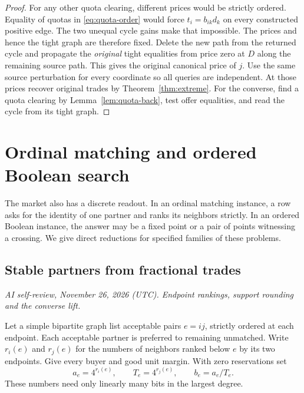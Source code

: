 \documentclass[11pt,oneside,openany,notitlepage]{report}
\newcommand{\reviewdate}{November 26, 2026 (UTC)}
\newcommand{\reviewmark}[1]{\par\nopagebreak[4]\noindent
  {\footnotesize\itshape AI self-review, \reviewdate. #1\par}\nobreak\smallskip}
\begin{document}
\begin{proof}
For any other quota clearing, different prices would be strictly ordered.
Equality of quotas in \eqref{eq:quota-order} would force
\(t_i=b_{ik}d_k\) on every constructed positive edge. The two unequal
cycle gains make that impossible. The prices and hence the tight graph
are therefore fixed. Delete the new path from the returned cycle and
propagate the \emph{original} tight equalities from price zero at \(D\)
along the remaining source path. This gives the original canonical price
of \(j\). Use the same source perturbation for every coordinate so all
queries are independent. At those prices recover original trades by
Theorem~\ref{thm:extreme}. For the converse, find a quota clearing by
Lemma~\ref{lem:quota-back}, test offer equalities, and read the cycle
from its tight graph.
\end{proof}

\chapter{Ordinal matching and ordered Boolean search}\label{sec:boolean}

The market also has a discrete readout. In an ordinal matching instance,
a row asks for the identity of one partner and ranks its neighbors
strictly. In an ordered Boolean instance, the answer may be a fixed
point or a pair of points witnessing a crossing. We give direct
reductions for specified families of these problems.

\section{Stable partners from fractional trades}
\reviewmark{Endpoint rankings, support rounding and the converse lift.}

Let a simple bipartite graph list acceptable pairs \(e=ij\), strictly
ordered at each endpoint. Each acceptable partner is preferred to
remaining unmatched. Write \(r_i(e)\) and \(r_j(e)\) for the numbers of
neighbors ranked below \(e\) by its two endpoints. Give every buyer and
good unit margin. With zero reservations set
\[
 a_e=4^{r_i(e)},\qquad T_e=4^{r_j(e)},\qquad b_e=a_e/T_e .
\]
These numbers need only linearly many bits in the largest degree.
\end{document}
